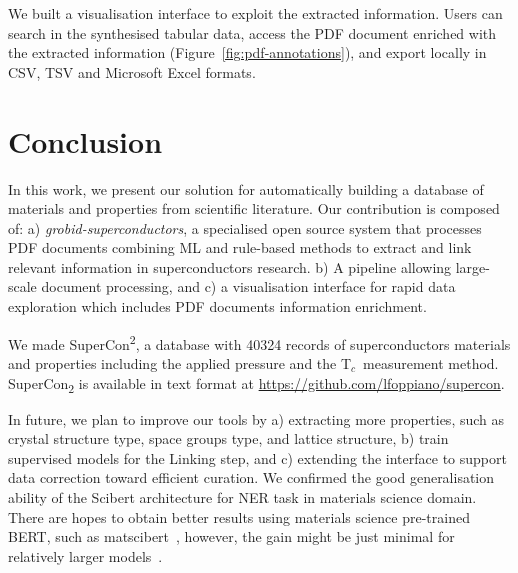 \documentclass[]{interact}
\theoremstyle{plain}%
\theoremstyle{definition}
\theoremstyle{remark}
\newcommand{\tc}{T$_{c}$}
\begin{document}

We built a visualisation interface to exploit the extracted information.
Users can search in the synthesised tabular data, access the PDF document enriched with the extracted information (Figure~\ref{fig:pdf-annotations}), and export locally in CSV, TSV and Microsoft Excel formats.

\section{Conclusion}
\label{sec:conclusion}
In this work, we present our solution for automatically building a database of materials and properties from scientific literature.
Our contribution is composed of: a) \textit{grobid-superconductors}, a specialised open source system that processes PDF documents combining ML and rule-based methods to extract and link relevant information in superconductors research.
b) A pipeline allowing large-scale document processing, and c) a visualisation interface for rapid data exploration which includes PDF documents information enrichment.

We made SuperCon\textsuperscript{2}, a database with 40324 records of superconductors materials and properties including the applied pressure and the \tc~measurement method.
SuperCon\textsubscript{2} is available in text format at \url{https://github.com/lfoppiano/supercon}.

In future, we plan to improve our tools by a) extracting more properties, such as crystal structure type, space groups type, and lattice structure, b) train supervised models for the Linking step, and c) extending the interface to support data correction toward efficient curation.
We confirmed the good generalisation ability of the Scibert architecture for NER task in materials science domain.
There are hopes to obtain better results using materials science pre-trained BERT, such as matscibert~\cite{gupta_matscibert_2022}, however, the gain might be just minimal for relatively larger models~\cite{hong2022ScholarBERT}.
\end{document}
